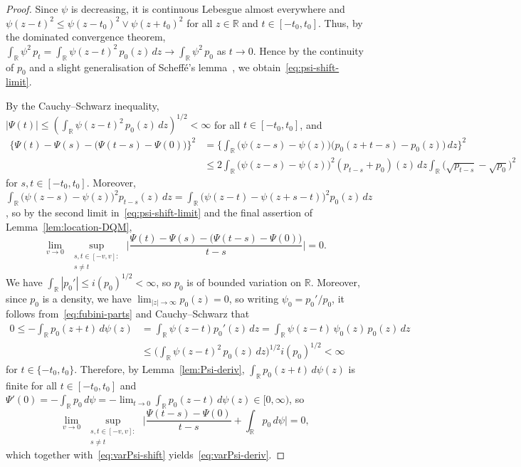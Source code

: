 \documentclass[a4paper]{article}
\newcommand{\R}{\mathbb{R}}
\theoremstyle{definition}
\begin{document}
\begin{proof}
Since $\psi$ is decreasing, it is continuous Lebesgue almost everywhere and $\psi(z - t)^2 \leq \psi(z - t_0)^2 \vee \psi(z + t_0)^2$ for all $z \in \R$ and $t \in [-t_0, t_0]$. Thus, by the dominated convergence theorem, $\int_\R \psi^2\,p_t =  \int_\R \psi(z - t)^2\,p_0(z)\,dz \to \int_\R \psi^2\,p_0$ as $t \to 0$. Hence by the continuity of $p_0$ and a slight generalisation of Scheff\'e's lemma~\citep[Lemma~2.29]{vdV1998asymptotic}, we obtain~\eqref{eq:psi-shift-limit}.

By the Cauchy--Schwarz inequality, $|\varPsi(t)| \leq (\int_\R \psi(z - t)^2\,p_0(z)\,dz)^{1/2} < \infty$ for all $t \in [-t_0,t_0]$, and
\begin{align*}
\bigl\{\varPsi(t) - \varPsi(s) - \bigl(\varPsi(t - s) - \varPsi(0)\bigr)\bigr\}^2 &= \biggl\{\int_\R \bigl(\psi(z - s) - \psi(z)\bigr)\bigl(p_0(z + t - s) - p_0(z)\bigr)\,dz\biggr\}^2 \\
&\leq 2\!\int_\R \bigl(\psi(z - s) - \psi(z)\bigr)^2(p_{t - s} + p_0)(z)\,dz \!\int_\R \bigl(\sqrt{p_{t - s}} - \sqrt{p_0}\bigr)^2
\end{align*}
for $s,t \in [-t_0,t_0]$. 
Moreover, $\int_\R \bigl(\psi(z - s) - \psi(z)\bigr)^2 p_{t - s}(z)\,dz = \int_\R \bigl(\psi(z - t) - \psi(z + s - t)\bigr)^2 p_0(z)\,dz$, so by the second limit in~\eqref{eq:psi-shift-limit} and the final assertion of Lemma~\ref{lem:location-DQM},
\begin{equation}
\label{eq:varPsi-shift}
\lim_{v \to 0}\,\sup_{\substack{s,t \in [-v,v] : \\ s \neq t}}\,\biggl|\frac{\varPsi(t) - \varPsi(s) - \bigl(\varPsi(t - s) - \varPsi(0)\bigr)}{t - s}\biggr| = 0.
\end{equation}
We have $\int_\R |p_0'| \leq i(p_0)^{1/2} < \infty$, so $p_0$ is of bounded variation on $\R$. Moreover, since $p_0$ is a density, we have $\lim_{|z| \to \infty} p_0(z) = 0$, so writing $\psi_0 = p_0'/p_0$, it follows from~\eqref{eq:fubini-parts} and Cauchy--Schwarz that
\begin{align*}
0 \leq -\int_\R p_0(z + t)\,d\psi(z) &= \int_\R \psi(z - t) p_0'(z)\,dz = \int_\R \psi(z - t)\,\psi_0(z)\,p_0(z)\,dz \\
&\leq \biggl(\int_\R \psi(z - t)^2\,p_0(z)\,dz\biggr)^{1/2} i(p_0)^{1/2} < \infty
\end{align*}
for $t \in \{-t_0,t_0\}$. Therefore, by Lemma~\ref{lem:Psi-deriv}, $\int_\R p_0(z + t)\,d\psi(z)$ is finite for all $t \in [-t_0,t_0]$ and $\varPsi'(0) = -\int_\R p_0\,d\psi = -\lim_{t \to 0} \int_\R p_0(z - t)\,d\psi(z) \in [0,\infty)$, so
\[
\lim_{v \to 0}\,\sup_{\substack{s,t \in [-v,v] : \\ s \neq t}}\,\biggl|\frac{\varPsi(t - s) - \varPsi(0)}{t - s} + \int_\R p_0\,d\psi\biggr| = 0,
\]
which together with~\eqref{eq:varPsi-shift} yields~\eqref{eq:varPsi-deriv}.
\end{proof}
\end{document}
